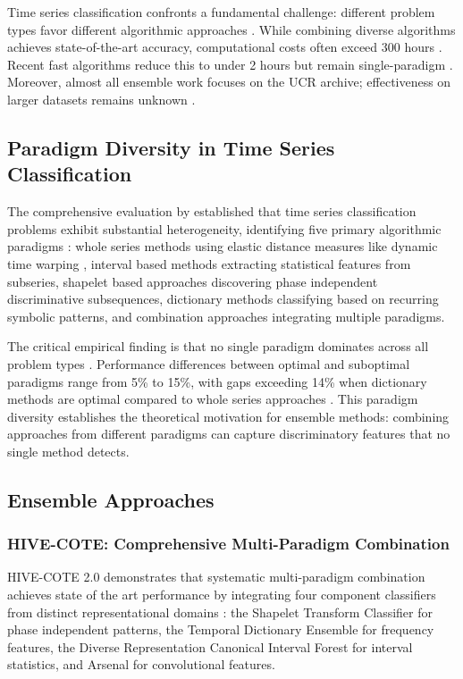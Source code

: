 \documentclass[pdflatex,sn-basic]{sn-jnl}           %
\theoremstyle{thmstyleone}%
\theoremstyle{thmstyletwo}%
\theoremstyle{thmstylethree}%
\begin{document}
Time series classification confronts a fundamental challenge: different problem types favor different algorithmic approaches \citep{tsc-bakeoff}. While combining diverse algorithms achieves state-of-the-art accuracy, computational costs often exceed 300 hours \citep{hive-cote-2}. Recent fast algorithms reduce this to under 2 hours but remain single-paradigm \citep{rocket, hydra, quant}. Moreover, almost all ensemble work focuses on the UCR archive; effectiveness on larger datasets remains unknown \citep{bakeoff-redux}.

\subsection{Paradigm Diversity in Time Series Classification}

The comprehensive evaluation by \citet{tsc-bakeoff} established that time series classification problems exhibit substantial heterogeneity, identifying five primary algorithmic paradigms \citep[Section~2, pp.~610--611]{tsc-bakeoff}: whole series methods using elastic distance measures like dynamic time warping \citep[p.~611]{tsc-bakeoff}, interval based methods extracting statistical features from subseries, shapelet based approaches discovering phase independent discriminative subsequences, dictionary methods classifying based on recurring symbolic patterns, and combination approaches integrating multiple paradigms.

The critical empirical finding is that no single paradigm dominates across all problem types \citep[Table~11, p.~648]{tsc-bakeoff}. Performance differences between optimal and suboptimal paradigms range from 5\% to 15\%, with gaps exceeding 14\% when dictionary methods are optimal compared to whole series approaches \citep[Table~11, p.~648]{tsc-bakeoff}. This paradigm diversity establishes the theoretical motivation for ensemble methods: combining approaches from different paradigms can capture discriminatory features that no single method detects.

\subsection{Ensemble Approaches}

\subsubsection{HIVE-COTE: Comprehensive Multi-Paradigm Combination}

HIVE-COTE 2.0 demonstrates that systematic multi-paradigm combination achieves state of the art performance by integrating four component classifiers from distinct representational domains \citep[p.~3]{hive-cote-2}: the Shapelet Transform Classifier for phase independent patterns, the Temporal Dictionary Ensemble for frequency features, the Diverse Representation Canonical Interval Forest for interval statistics, and Arsenal for convolutional features.
\end{document}

